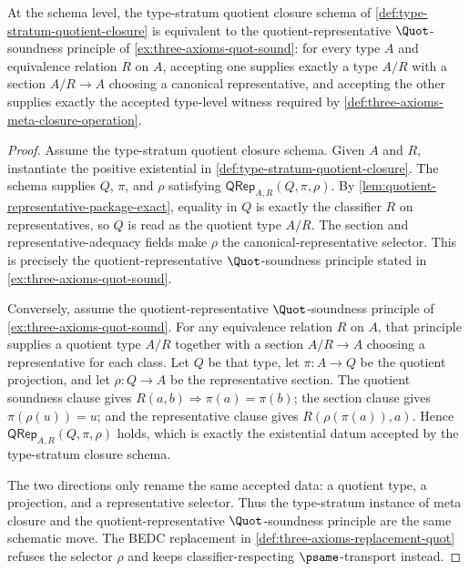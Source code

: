 \begin{theorem}
\label{thm:quot-sound-type-stratum-meta-closure}
At the schema level, the type-stratum quotient closure schema of \autoref{def:type-stratum-quotient-closure} is equivalent to the quotient-representative $\Quot$-soundness principle of \autoref{ex:three-axioms-quot-sound}: for every type $A$ and equivalence relation $R$ on $A$, accepting one supplies exactly a type $A/R$ with a section $A/R\to A$ choosing a canonical representative, and accepting the other supplies exactly the accepted type-level witness required by \autoref{def:three-axioms-meta-closure-operation}.
\end{theorem}

\begin{proof}
Assume the type-stratum quotient closure schema. Given $A$ and $R$, instantiate the positive existential in \autoref{def:type-stratum-quotient-closure}. The schema supplies $Q$, $\pi$, and $\rho$ satisfying $\mathsf{QRep}_{A,R}(Q,\pi,\rho)$. By \autoref{lem:quotient-representative-package-exact}, equality in $Q$ is exactly the classifier $R$ on representatives, so $Q$ is read as the quotient type $A/R$. The section and representative-adequacy fields make $\rho$ the canonical-representative selector. This is precisely the quotient-representative $\Quot$-soundness principle stated in \autoref{ex:three-axioms-quot-sound}.

Conversely, assume the quotient-representative $\Quot$-soundness principle of \autoref{ex:three-axioms-quot-sound}. For any equivalence relation $R$ on $A$, that principle supplies a quotient type $A/R$ together with a section $A/R\to A$ choosing a representative for each class. Let $Q$ be that type, let $\pi:A\to Q$ be the quotient projection, and let $\rho:Q\to A$ be the representative section. The quotient soundness clause gives $R(a,b)\Longrightarrow \pi(a)=\pi(b)$; the section clause gives $\pi(\rho(u))=u$; and the representative clause gives $R(\rho(\pi(a)),a)$. Hence $\mathsf{QRep}_{A,R}(Q,\pi,\rho)$ holds, which is exactly the existential datum accepted by the type-stratum closure schema.

The two directions only rename the same accepted data: a quotient type, a projection, and a representative selector. Thus the type-stratum instance of meta closure and the quotient-representative $\Quot$-soundness principle are the same schematic move. The BEDC replacement in \autoref{def:three-axioms-replacement-quot} refuses the selector $\rho$ and keeps classifier-respecting $\psame$-transport instead.
\end{proof}

